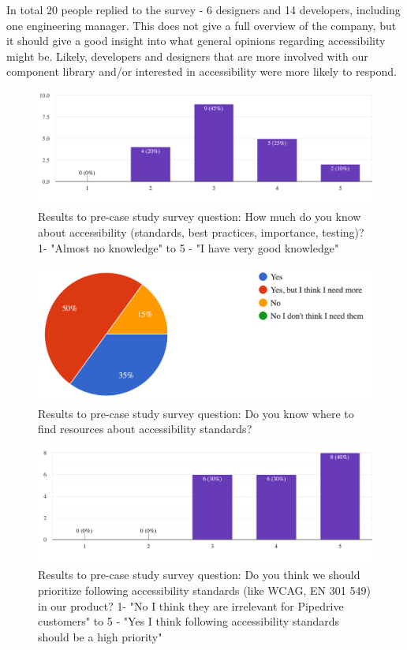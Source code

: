 \documentclass{master_thesis}
\begin{document}
In total 20 people replied to the survey - 6 designers and 14 developers, including one engineering manager. This does not give a full overview of the company, but it should give a good insight into what general opinions regarding accessibility might be. Likely, developers and designers that are more involved with our component library and/or interested in accessibility were more likely to respond.

\begin{figure}[h!]
	\includegraphics[width=\textwidth]{img/a11y-knowledge.png}
	\caption{Results to pre-case study survey question: How much do you know about accessibility (standards, best practices, importance, testing)? 1- "Almost no knowledge" to 5 - "I have very good knowledge" }
	\label{fig:a11y-knowledge}
\end{figure}

\begin{figure}[h!]
	\includegraphics[width=\textwidth]{img/a11y-resources.png}
	\caption{Results to pre-case study survey question: Do you know where to find resources about accessibility standards? }
	\label{fig:a11y-resources}
\end{figure}

\begin{figure}[h!]
	\includegraphics[width=\textwidth]{img/a11y-priority.png}
	\caption{Results to pre-case study survey question: Do you think we should prioritize following accessibility standards (like WCAG, EN 301 549) in our product? 1- "No I think they are irrelevant for Pipedrive customers" to 5 - "Yes I think following accessibility standards should be a high priority" }
	\label{fig:a11y-priority}
\end{figure}
\end{document}
